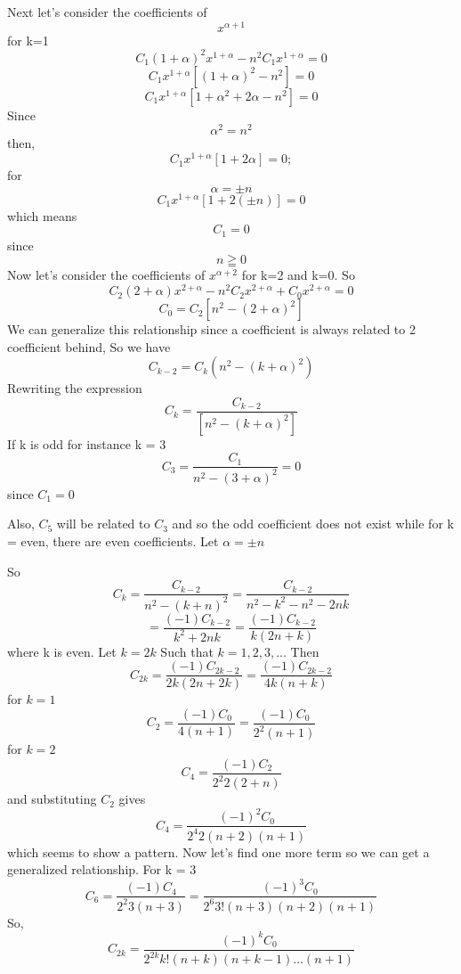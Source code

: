 Next let's consider the coefficients of $$x^{\alpha + 1}$$ for k=1
$$C_1(1 + \alpha)^2 x^{1 + \alpha} - n^2 C_1 x^{1 + \alpha} = 0$$
$$C_1x^{1 + \alpha}[(1 + \alpha)^2 - n^2] =0$$
$$C_1x^{1 + \alpha}[1 + \alpha^2 + 2\alpha - n^2] =0$$
Since $$\alpha^2 = n^2$$ then,
$$C_1x^{1 + \alpha}[1 + 2\alpha] =0;$$ for   $$\alpha =\pm n$$
$$C_1x^{1 + \alpha}[1 + 2(\pm n)] = 0$$ which means $$C_1 = 0$$ since $$n \geqq 0$$
Now let's consider the coefficients of $x^{\alpha + 2}$ for k=2 and k=0.
So $$C_2(2 + \alpha) x^{2 + \alpha} - n^2 C_2x^{2 + \alpha} + C_0x^{2 + \alpha} = 0$$
$$C_0 = C_2[n^2 - (2 + \alpha)^2]$$
We can generalize this relationship since a coefficient is always related to 2 coefficient behind, So we have 
$$C_{k-2} = C_k (n^2 - (k + \alpha)^2)$$
Rewriting the expression
$$C_k = \frac{C_{k-2}}{[n^2 - (k + \alpha)^2]}$$
If k is odd for instance k = 3
$$C_3 = \frac{C_{1}}{n^2 - (3 + \alpha)^2} = 0$$ since $C_1 = 0$ 

Also, $C_5$ will be related to $C_3$ and so the odd coefficient does not exist while for k = even, there are even coefficients.
Let $\alpha = \pm n$

So 
$$C_k = \frac{C_{k-2}}{n^2 - (k + n)^2} = \frac{C_{k-2}}{n^2 - k^2 - n^2 - 2nk}$$
$$ =\frac{(-1) C_{k-2}}{k^2 + 2nk} = \frac{(-1) C_{k-2}}{k(2n + k)}$$ where k is even. 
Let $k =2k$ Such that $k = 1, 2, 3, ...$
Then $$C_{2k} = \frac{(-1) C_{2k-2}}{2k(2n + 2k)} = \frac{(-1) C_{2k-2}}{4k(n + k)}$$
for $k=1$
$$C_2 = \frac{(-1) C_0}{4(n + 1)} = \frac{(-1) C_0}{2^2(n + 1)}$$
for $k = 2$
$$C_4 = \frac{(-1) C_2}{2^2 2(2 + n)}$$ and substituting $C_2$ gives 
$$C_4 = \frac{(-1)^2 C_0}{2^4 2(n + 2)(n + 1)}$$
which seems to show a pattern. Now let's find one more term so we can get a generalized relationship.
For k = 3
$$C_6 = \frac{(-1) C_4}{2^2 3(n + 3)} = \frac{(-1)^3 C_0}{2^6 3!(n + 3)(n + 2)(n + 1)}$$	
So, $$ C_{2k} = \frac{(-1)^k C_0}{2^{2k} k!(n + k)(n + k-1)... (n + 1)}$$	

